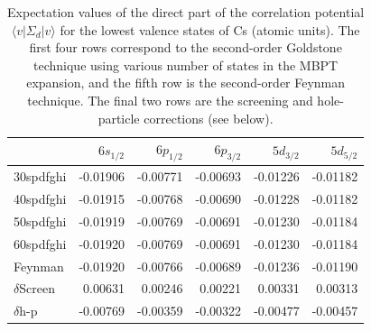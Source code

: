 \documentclass[10pt,twocolumn,a4paper]{article}%
\newcommand{\bra}[1]{\ensuremath{\langle #1|}}	%
\newcommand{\ket}[1]{\ensuremath{|#1\rangle}}	%
\def\d{\ensuremath{{\rm d}}}
\def\en{\ensuremath{\varepsilon}}
\newcommand{\w}{\ensuremath{\omega}}
\begin{document}
\begin{table}%
\small
\centering
\caption{\small
Expectation values of the direct part of the correlation potential $\bra{v}\Sigma_d\ket{v}$ for the lowest valence states of Cs (atomic units).
The first four rows correspond to the second-order Goldstone technique using various number of states in the MBPT expansion, and the fifth row is the second-order Feynman technique.
The final two rows are the screening and hole-particle corrections (see below).
\label{tab:de-direct}}
\begin{tabular}{lrrrrr}
\hline
\hline
           & $6s_{1/2}$  & $6p_{1/2}$  & $6p_{3/2}$  & $5d_{3/2}$  & $5d_{5/2}$  \\
\hline
30spdfghi  & -0.01906 & -0.00771 & -0.00693 & -0.01226 & -0.01182 \\
40spdfghi  & -0.01915 & -0.00768 & -0.00690 & -0.01228 & -0.01182 \\
50spdfghi  & -0.01919 & -0.00769 & -0.00691 & -0.01230 & -0.01184 \\
60spdfghi  & -0.01920 & -0.00769 & -0.00691 & -0.01230 & -0.01184 \\[0.15cm]
%
Feynman & -0.01920 & -0.00766 & -0.00689 & -0.01236 & -0.01190 \\[0.15cm]
%
$\delta$Screen & 0.00631  & 0.00246  & 0.00221  & 0.00331  & 0.00313  \\
$\delta$h-p     & -0.00769 & -0.00359 & -0.00322 & -0.00477 & -0.00457 \\
\hline
\hline
\end{tabular}
\end{table}










%
%
%
\end{document}
